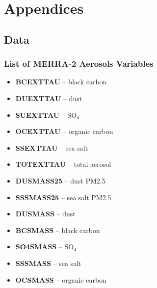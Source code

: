 \documentclass[draft]{agujournal2019}
\begin{document}
\pagebreak

\section{Appendices}

\subsection{Data}
    \subsubsection{List of MERRA-2 Aerosols Variables}
    \begin{itemize}
        \item \textbf{BCEXTTAU} -- black carbon
        \item \textbf{DUEXTTAU} -- dust
        \item \textbf{SUEXTTAU} -- SO\(_4\)
        \item \textbf{OCEXTTAU} -- organic carbon
        \item \textbf{SSEXTTAU} -- sea salt
        \item \textbf{TOTEXTTAU} -- total aerosol
        \item \textbf{DUSMASS25} -- dust PM2.5
        \item \textbf{SSSMASS25} -- sea salt PM2.5
        \item \textbf{DUSMASS} -- dust
        \item \textbf{BCSMASS} -- black carbon
        \item \textbf{SO4SMASS} -- SO\(_4\)
        \item \textbf{SSSMASS} -- sea salt
        \item \textbf{OCSMASS} -- organic carbon
    \end{itemize}
        
\end{document}
